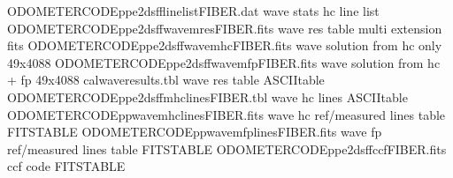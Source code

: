 \documentclass[a4paper,10pt,english]{report}
\begin{document}
\begin{sphinxVerbatim}[commandchars=\\\{\}]
ODOMETER\PYGZus{}CODE\PYGZus{}pp\PYGZus{}e2dsff\PYGZus{}linelist\PYGZus{}FIBER.dat       wave stats hc line list
ODOMETER\PYGZus{}CODE\PYGZus{}pp\PYGZus{}e2dsff\PYGZus{}wavemres\PYGZus{}FIBER.fits      wave res table multi extension fits
ODOMETER\PYGZus{}CODE\PYGZus{}pp\PYGZus{}e2dsff\PYGZus{}wavem\PYGZus{}hc\PYGZus{}FIBER.fits      wave solution from hc only 49x4088
ODOMETER\PYGZus{}CODE\PYGZus{}pp\PYGZus{}e2dsff\PYGZus{}wavem\PYGZus{}fp\PYGZus{}FIBER.fits      wave solution from hc + fp 49x4088
cal\PYGZus{}wave\PYGZus{}results.tbl                                 wave res table ASCII\PYGZhy{}table
ODOMETER\PYGZus{}CODE\PYGZus{}pp\PYGZus{}e2dsff\PYGZus{}mhc\PYGZus{}lines\PYGZus{}FIBER.tbl      wave hc lines ASCII\PYGZhy{}table
ODOMETER\PYGZus{}CODE\PYGZus{}pp\PYGZus{}wavem\PYGZus{}hclines\PYGZus{}FIBER.fits        wave hc ref/measured lines table FITS\PYGZhy{}TABLE
ODOMETER\PYGZus{}CODE\PYGZus{}pp\PYGZus{}wavem\PYGZus{}fplines\PYGZus{}FIBER.fits       wave fp ref/measured lines table FITS\PYGZhy{}TABLE
ODOMETER\PYGZus{}CODE\PYGZus{}pp\PYGZus{}e2dsff\PYGZus{}ccf\PYGZus{}FIBER.fits           ccf code \PYG{o}{[}FITS\PYGZhy{}TABLE\PYG{o}{]}
\end{sphinxVerbatim}
\end{document}
